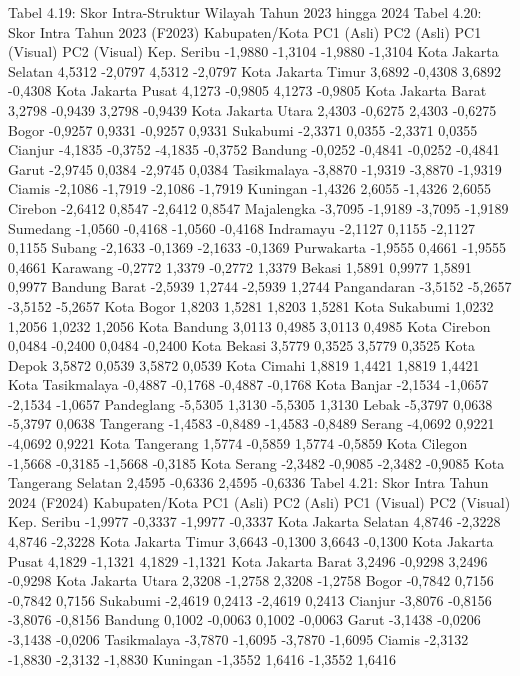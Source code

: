 Tabel 4.19: Skor Intra-Struktur Wilayah Tahun 2023 hingga 2024
Tabel 4.20: Skor Intra Tahun 2023 (F2023)
Kabupaten/Kota PC1 (Asli) PC2 (Asli) PC1 (Visual) PC2 (Visual)
Kep. Seribu -1,9880 -1,3104 -1,9880 -1,3104
Kota Jakarta Selatan 4,5312 -2,0797 4,5312 -2,0797
Kota Jakarta Timur 3,6892 -0,4308 3,6892 -0,4308
Kota Jakarta Pusat 4,1273 -0,9805 4,1273 -0,9805
Kota Jakarta Barat 3,2798 -0,9439 3,2798 -0,9439
Kota Jakarta Utara 2,4303 -0,6275 2,4303 -0,6275
Bogor -0,9257 0,9331 -0,9257 0,9331
Sukabumi -2,3371 0,0355 -2,3371 0,0355
Cianjur -4,1835 -0,3752 -4,1835 -0,3752
Bandung -0,0252 -0,4841 -0,0252 -0,4841
Garut -2,9745 0,0384 -2,9745 0,0384
Tasikmalaya -3,8870 -1,9319 -3,8870 -1,9319
Ciamis -2,1086 -1,7919 -2,1086 -1,7919
Kuningan -1,4326 2,6055 -1,4326 2,6055
Cirebon -2,6412 0,8547 -2,6412 0,8547
Majalengka -3,7095 -1,9189 -3,7095 -1,9189
Sumedang -1,0560 -0,4168 -1,0560 -0,4168
Indramayu -2,1127 0,1155 -2,1127 0,1155
Subang -2,1633 -0,1369 -2,1633 -0,1369
Purwakarta -1,9555 0,4661 -1,9555 0,4661
Karawang -0,2772 1,3379 -0,2772 1,3379
Bekasi 1,5891 0,9977 1,5891 0,9977
Bandung Barat -2,5939 1,2744 -2,5939 1,2744
Pangandaran -3,5152 -5,2657 -3,5152 -5,2657
Kota Bogor 1,8203 1,5281 1,8203 1,5281
Kota Sukabumi 1,0232 1,2056 1,0232 1,2056
Kota Bandung 3,0113 0,4985 3,0113 0,4985
Kota Cirebon 0,0484 -0,2400 0,0484 -0,2400
Kota Bekasi 3,5779 0,3525 3,5779 0,3525
Kota Depok 3,5872 0,0539 3,5872 0,0539
Kota Cimahi 1,8819 1,4421 1,8819 1,4421
Kota Tasikmalaya -0,4887 -0,1768 -0,4887 -0,1768
Kota Banjar -2,1534 -1,0657 -2,1534 -1,0657
Pandeglang -5,5305 1,3130 -5,5305 1,3130
Lebak -5,3797 0,0638 -5,3797 0,0638
Tangerang -1,4583 -0,8489 -1,4583 -0,8489
Serang -4,0692 0,9221 -4,0692 0,9221
Kota Tangerang 1,5774 -0,5859 1,5774 -0,5859
Kota Cilegon -1,5668 -0,3185 -1,5668 -0,3185
Kota Serang -2,3482 -0,9085 -2,3482 -0,9085
Kota Tangerang Selatan 2,4595 -0,6336 2,4595 -0,6336
Tabel 4.21: Skor Intra Tahun 2024 (F2024)
Kabupaten/Kota PC1 (Asli) PC2 (Asli) PC1 (Visual) PC2 (Visual)
Kep. Seribu -1,9977 -0,3337 -1,9977 -0,3337
Kota Jakarta Selatan 4,8746 -2,3228 4,8746 -2,3228
Kota Jakarta Timur 3,6643 -0,1300 3,6643 -0,1300
Kota Jakarta Pusat 4,1829 -1,1321 4,1829 -1,1321
Kota Jakarta Barat 3,2496 -0,9298 3,2496 -0,9298
Kota Jakarta Utara 2,3208 -1,2758 2,3208 -1,2758
Bogor -0,7842 0,7156 -0,7842 0,7156
Sukabumi -2,4619 0,2413 -2,4619 0,2413
Cianjur -3,8076 -0,8156 -3,8076 -0,8156
Bandung 0,1002 -0,0063 0,1002 -0,0063
Garut -3,1438 -0,0206 -3,1438 -0,0206
Tasikmalaya -3,7870 -1,6095 -3,7870 -1,6095
Ciamis -2,3132 -1,8830 -2,3132 -1,8830
Kuningan -1,3552 1,6416 -1,3552 1,6416
